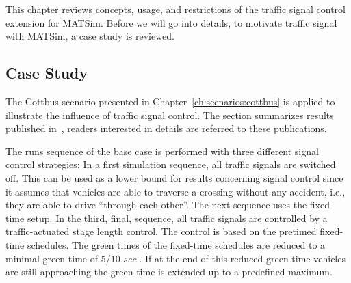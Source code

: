 This chapter reviews concepts, usage, and restrictions of the traffic signal control extension for MATSim. 
Before we will go into details, to motivate traffic signal with MATSim, a case study is reviewed. 
%

\subsection{Case Study}

The Cottbus scenario presented in Chapter~\ref{ch:scenarios:cottbus} is applied to illustrate the influence of traffic signal control. 
The section summarizes results published in~\citet{GretherBischoffNagel2011CottbusSylviaEventAbstract,Grether2014PhD}, readers interested in details are referred to these publications. 

%
The runs sequence of the base case is performed with three different signal control strategies:
%
In a first simulation sequence, all traffic signals are switched off. This can be used as a lower bound for results concerning signal control since it assumes that vehicles are able to traverse a crossing without any accident, i.e., they are able to drive ``through each other''. 
%
The next sequence uses the fixed-time setup. 
%
In the third, final, sequence, all traffic signals are controlled by a traffic-actuated stage length control. 
The control is based on the pretimed fixed-time schedules. 
The green times of the fixed-time schedules are reduced to a minimal green time of $5$/$10$ $sec.$. 
If at the end of this reduced green time vehicles are still approaching the green time is extended up to a predefined maximum. 

